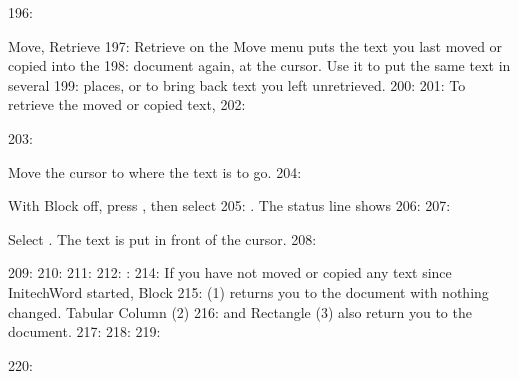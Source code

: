 196: \begin{Feature}{Move, Retrieve}
197: Retrieve on the Move menu puts the text you last moved or copied into the
198: document again, at the cursor.  Use it to put the same text in several
199: places, or to bring back text you left unretrieved.
200: 
201: To retrieve the moved or copied text,
202: \begin{WPSteps}
203: \item Move the cursor to where the text is to go.
204: \item With Block off, press , then select
205: .  The status line shows
206: 
207: \item Select .  The text is put in front of the cursor.
208: \end{WPSteps}
209: 
210: 
211: 
212: : 
214: If you have not moved or copied any text since InitechWord started, Block
215: (1) returns you to the document with nothing changed.  Tabular Column (2)
216: and Rectangle (3) also return you to the document.
217: 
218: 
219: \end{Feature}
220: 
